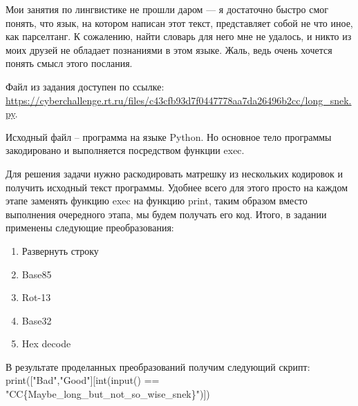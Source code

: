 
Мои занятия по лингвистике не прошли даром — я достаточно быстро смог понять, что язык, на котором написан этот текст, представляет собой не что иное, как парселтанг. К сожалению, найти словарь для него мне не удалось, и никто из моих друзей не обладает познаниями в этом языке. Жаль, ведь очень хочется понять смысл этого послания.

Файл из задания доступен по ссылке: \url{https://cyberchallenge.rt.ru/files/c43cfb93d7f0447778aa7da26496b2cc/long_snek.py}.

\solutionSection

Исходный файл – программа на языке Python. Но основное тело программы закодировано и выполняется посредством функции exec.

Для решения задачи нужно раскодировать матрешку из нескольких кодировок и получить исходный текст программы. Удобнее всего для этого просто на каждом этапе заменять функцию exec на функцию print, таким образом вместо выполнения очередного этапа, мы будем получать его код. Итого, в задании применены следующие преобразования:
\begin{enumerate}
    \item Развернуть строку
    \item Base85
    \item Rot-13
    \item Base32
    \item Hex decode
\end{enumerate}

В результате проделанных преобразований получим следующий скрипт:\\
print(["Bad","Good"][int(input() == "CC\{Maybe\_long\_but\_not\_so\_wise\_snek\}")])

